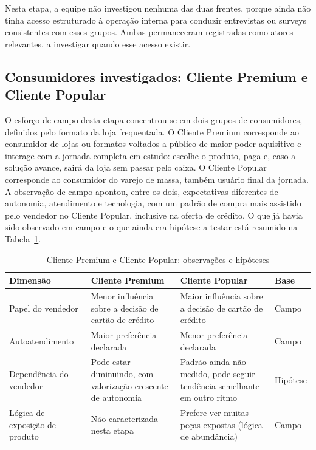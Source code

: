 Nesta etapa, a equipe não investigou nenhuma das duas frentes, porque ainda não tinha acesso estruturado à operação interna para conduzir entrevistas ou surveys consistentes com esses grupos. Ambas permaneceram registradas como atores relevantes, a investigar quando esse acesso existir.

\subsection{Consumidores investigados: Cliente Premium e Cliente Popular}
\label{subsec:segmentacao_clientes_usuarios}

O esforço de campo desta etapa concentrou-se em dois grupos de consumidores, definidos pelo formato da loja frequentada. O Cliente Premium corresponde ao consumidor de lojas ou formatos voltados a público de maior poder aquisitivo e interage com a jornada completa em estudo: escolhe o produto, paga e, caso a solução avance, sairá da loja sem passar pelo caixa. O Cliente Popular corresponde ao consumidor do varejo de massa, também usuário final da jornada. A observação de campo apontou, entre os dois, expectativas diferentes de autonomia, atendimento e tecnologia, com um padrão de compra mais assistido pelo vendedor no Cliente Popular, inclusive na oferta de crédito. O que já havia sido observado em campo e o que ainda era hipótese a testar está resumido na Tabela~\ref{tab:segmentacao_grupos}.

\begin{table}[htbp]
    \centering
    \caption{Cliente Premium e Cliente Popular: observações e hipóteses}
    \label{tab:segmentacao_grupos}
    \footnotesize
    \renewcommand{\arraystretch}{1.4}
    \begin{tabularx}{\textwidth}{@{}
        >{\RaggedRight\arraybackslash}p{3.1cm}
        >{\RaggedRight\arraybackslash}X
        >{\RaggedRight\arraybackslash}X
        >{\centering\arraybackslash}p{1.9cm}@{}}
        \toprule
        \textbf{Dimensão} & \textbf{Cliente Premium} & \textbf{Cliente Popular} & \textbf{Base} \\
        \midrule
        Papel do vendedor
            & Menor influência sobre a decisão de cartão de crédito
            & Maior influência sobre a decisão de cartão de crédito
            & Campo \\
        \addlinespace
        Autoatendimento
            & Maior preferência declarada
            & Menor preferência declarada
            & Campo \\
        \addlinespace
        Dependência do vendedor
            & Pode estar diminuindo, com valorização crescente de autonomia
            & Padrão ainda não medido, pode seguir tendência semelhante em outro ritmo
            & Hipótese \\
        \addlinespace
        Lógica de exposição de produto
            & Não caracterizada nesta etapa
            & Prefere ver muitas peças expostas (lógica de abundância)
            & Campo \\
        \bottomrule
    \end{tabularx}
\end{table}

